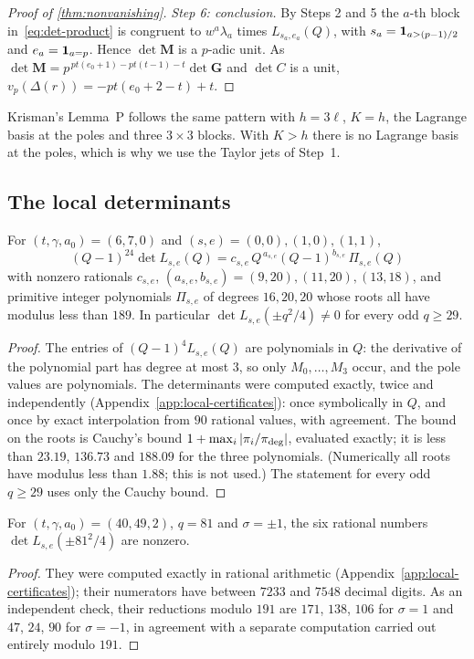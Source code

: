 \begin{proof}[Proof of \cref{thm:nonvanishing}]
\emph{Step 6: conclusion.} By Steps 2 and 5 the $a$-th block in~\eqref{eq:det-product} is
congruent to $w^a\lambda_a$ times $L_{s_a,e_a}(Q)$, with $s_a=\mathbf{1}_{a>(p-1)/2}$ and $e_a=\mathbf{1}_{a=p}$.
Hence $\det\mathbf M$ is a $p$-adic unit. As $\det\mathbf M=p^{\,pt(e_0+1)-pt(t-1)-t}\det\mathbf
G$ and $\det C$ is a unit, $v_p(\Delta(r))=-pt(e_0+2-t)+t$.
\end{proof}

Krisman's Lemma~P \cite[Thm.~8.1]{Krisman2026chi2} follows the same pattern with $h=3\ell$,
$K=h$, the Lagrange basis at the poles and three $3\times3$ blocks. With $K>h$ there is no
Lagrange basis at the poles, which is why we use the Taylor jets of Step~1.

\subsection{The local determinants}\label{subsec:local-dets}

\begin{proposition}\label{prop:local-dets-general}
For $(t,\gamma,a_0)=(6,7,0)$ and $(s,e)=(0,0),(1,0),(1,1)$,
\[
  (Q-1)^{24}\det L_{s,e}(Q)=c_{s,e}\,Q^{\,a_{s,e}}(Q-1)^{b_{s,e}}\,\Pi_{s,e}(Q)
\]
with nonzero rationals $c_{s,e}$, $(a_{s,e},b_{s,e})=(9,20),(11,20),(13,18)$, and primitive
integer polynomials $\Pi_{s,e}$ of degrees $16,20,20$ whose roots all have modulus less than
$189$. In particular $\det L_{s,e}(\pm q^2/4)\ne0$ for every odd $q\ge29$.
\end{proposition}

\begin{proof}
The entries of $(Q-1)^4L_{s,e}(Q)$ are polynomials in $Q$: the derivative of the polynomial part
has degree at most $3$, so only $M_0,\dots,M_3$ occur, and the pole values are polynomials. The
determinants were computed exactly, twice and independently (Appendix~\ref{app:local-certificates}): once
symbolically in $Q$, and once by exact interpolation from $90$ rational values, with agreement.
The bound on the roots is Cauchy's bound $1+\max_i\left\lvert \pi_i/\pi_{\deg}\right\rvert$, evaluated exactly; it
is less than $23.19$, $136.73$ and $188.09$ for the three polynomials. (Numerically all roots have modulus less
than $1.88$; this is not used.) The statement for every odd $q\ge29$ uses only the Cauchy bound.
\end{proof}

\begin{proposition}\label{prop:local-dets-band}
For $(t,\gamma,a_0)=(40,49,2)$, $q=81$ and $\sigma=\pm1$, the six rational numbers
$\det L_{s,e}(\pm81^2/4)$ are nonzero.
\end{proposition}

\begin{proof}
They were computed exactly in rational arithmetic (Appendix~\ref{app:local-certificates}); their
numerators have between $7233$ and $7548$ decimal digits. As an independent check, their
reductions modulo $191$ are $171$, $138$, $106$ for $\sigma=1$ and $47$, $24$, $90$ for
$\sigma=-1$, in agreement with a separate computation carried out entirely modulo $191$.
\end{proof}
